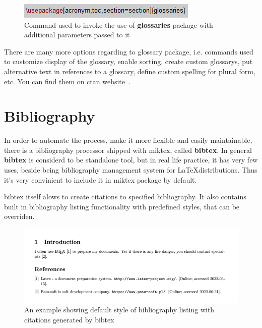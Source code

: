 \begin{figure}[H]
\centering
\includegraphics[scale=1.0]{content/LaTeX/figures/usepackage_glossaries.png}
\caption{Command used to invoke the use of \textbf{glossaries} package with additional parameters passed to it}
\label{fig:usepackage_glossaries}
\end{figure}

There are many more options regarding to \gls{glossary} package, i.e. commands used to customize display of the \gls{glossary}, enable sorting, create custom \glspl{glossary}, put alternative text in references to a \gls{glossary}, define custom spelling for plural form, etc. You can find them on \acrshort{ctan} \href{https://www.ctan.org/pkg/glossaries}{website}~\cite{ctan_glossaries}.

\section{Bibliography}

In order to automate the process, make it more flexible and easily maintainable, there is a bibliography processor shipped with \Gls{miktex}, called \textbf{\Gls{bibtex}}. In general \textbf{\Gls{bibtex}} is considerd to be standalone tool, but in real life practice, it has very few uses, beside being bibliography management system for \LaTeX distributions. Thus it's very convinient to include it in \Gls{miktex} package by default.

\Gls{bibtex} itself alows to create citations to specified bibliography. It also contains built in bibliography listing functionality with predefined styles, that can be overriden.

\begin{figure}[H]
\centering
\includegraphics[scale=0.8]{content/LaTeX/figures/biblio_outcome.png}
\caption{An example showing default style of bibliography listing with citations generated by \gls{bibtex}}
\label{fig:bibliography_example}
\end{figure}

